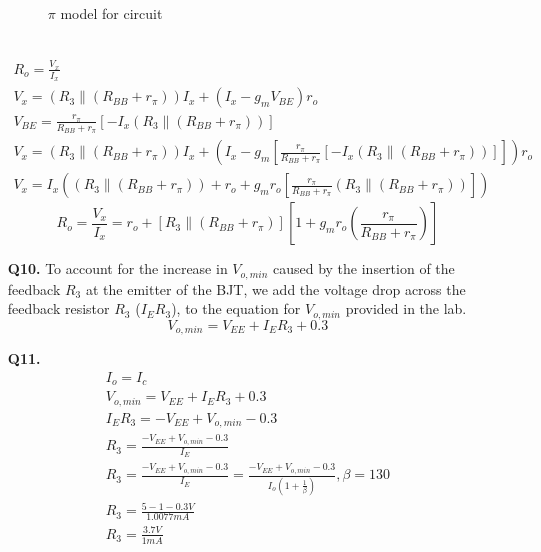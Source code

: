 \documentclass[12pt]{article}
\begin{document}
\begin{itemize}
\begin{figure}[ht!]
        \caption{$\pi$ model for circuit}
        \label{fig:q9}
    \end{figure} \\
    \begin{equation*}
    \begin{gathered}
        R_o = \frac{V_x}{I_x} \\
        V_x = (R_3 \parallel (R_{BB}+r_\pi))I_x + (I_x-g_mV_{BE})r_o \\
        V_{BE} = \frac{r_\pi}{R_{BB}+r_\pi}\left[-I_x(R_3 \parallel (R_{BB}+r_\pi))\right] \\
        V_x = (R_3 \parallel (R_{BB}+r_\pi))I_x + (I_x-g_m\left[\frac{r_\pi}{R_{BB}+r_\pi}\left[-I_x(R_3 \parallel (R_{BB}+r_\pi))\right]\right])r_o \\
        V_x = I_x ((R_3 \parallel (R_{BB}+r_\pi)) + r_o + g_mr_o\left[\frac{r_\pi}{R_{BB}+r_\pi}(R_3 \parallel (R_{BB}+r_\pi))\right])
    \end{gathered}
    \end{equation*}
    \begin{equation}
        R_o = \frac{V_x}{I_x} = r_o + \left[R_3 \parallel (R_{BB}+r_\pi)\right] \left[1 + g_mr_o\left(\frac{r_\pi}{R_{BB}+r_\pi}\right)\right]
    \end{equation}
    \item [\textbf{Q10.}]
    To account for the increase in $V_{o,min}$ caused by the insertion of the feedback $R_3$ at the emitter of the BJT, we add the voltage drop across the feedback resistor $R_3$ ($I_E R_3$), to the equation for $V_{o,min}$ provided in the lab.
    \begin{equation}
        V_{o,min} = V_{EE} + I_E R_3 + 0.3
    \end{equation}
    \item [\textbf{Q11.}]
    \begin{equation*}
    \begin{gathered}
        I_o = I_c \\
        V_{o,min} = V_{EE} + I_E R_3 + 0.3 \\
        I_E R_3 = -V_{EE} + V_{o,min} - 0.3 \\
        R_3 = \frac{-V_{EE} + V_{o,min} - 0.3}{I_E} \\
        R_3 = \frac{-V_{EE} + V_{o,min} - 0.3}{I_E} = \frac{-V_{EE} + V_{o,min} - 0.3}{I_o(1+\frac{1}{\beta})}, \beta = 130 \\
        R_3 = \frac{5 - 1 - 0.3 V}{1.0077 mA} \\
        R_3 = \frac{3.7 V}{1 mA} \\

\end{gathered}
\end{equation*}
\end{itemize}
\end{document}
